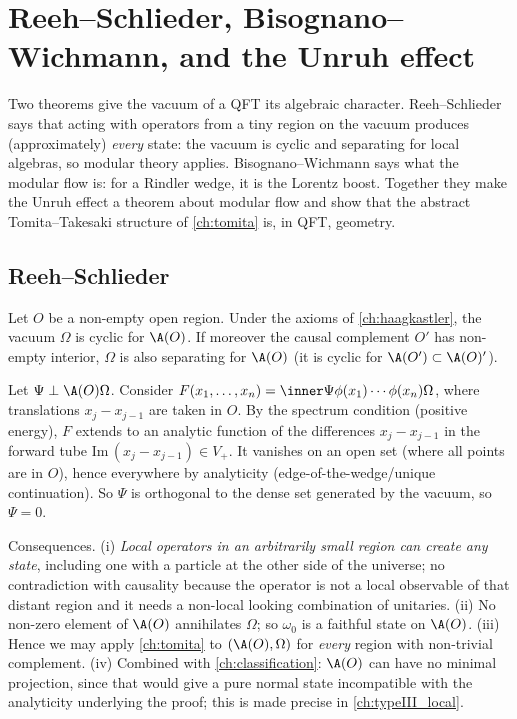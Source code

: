 \chapter{Reeh--Schlieder, Bisognano--Wichmann, and the Unruh effect}\label{ch:rs_bw}

\begin{physmotiv}
Two theorems give the vacuum of a QFT its algebraic character. Reeh--Schlieder says that acting with operators from a tiny region on the vacuum produces (approximately) \emph{every} state: the vacuum is cyclic and separating for local algebras, so modular theory applies. Bisognano--Wichmann says what the modular flow is: for a Rindler wedge, it is the Lorentz boost. Together they make the Unruh effect a theorem about modular flow and show that the abstract Tomita--Takesaki structure of \cref{ch:tomita} is, in QFT, geometry.
\end{physmotiv}

\section{Reeh--Schlieder}

\begin{theorem}
Let $O$ be a non-empty open region. Under the axioms of \cref{ch:haagkastler}, the vacuum $\Omega$ is cyclic for $\A(O)$. If moreover the causal complement $O'$ has non-empty interior, $\Omega$ is also separating for $\A(O)$ (it is cyclic for $\A(O')\subset\A(O)'$).
\end{theorem}

\begin{proofsketch}
Let $\Psi\perp\A(O)\Omega$. Consider $F(x_1,\dots,x_n)=\inner\Psi{\phi(x_1)\cdots\phi(x_n)\Omega}$, where translations $x_j-x_{j-1}$ are taken in $O$. By the spectrum condition (positive energy), $F$ extends to an analytic function of the differences $x_j-x_{j-1}$ in the forward tube $\mathrm{Im}\,(x_j-x_{j-1})\in V_+$. It vanishes on an open set (where all points are in $O$), hence everywhere by analyticity (edge-of-the-wedge/unique continuation). So $\Psi$ is orthogonal to the dense set generated by the vacuum, so $\Psi=0$.
\end{proofsketch}

Consequences. (i) \emph{Local operators in an arbitrarily small region can create any state}, including one with a particle at the other side of the universe; no contradiction with causality because the operator is not a local observable of that distant region and it needs a non-local looking combination of unitaries. (ii) No non-zero element of $\A(O)$ annihilates $\Omega$; so $\omega_0$ is a faithful state on $\A(O)$. (iii) Hence we may apply \cref{ch:tomita} to $(\A(O),\Omega)$ for \emph{every} region with non-trivial complement. (iv) Combined with \cref{ch:classification}: $\A(O)$ can have no minimal projection, since that would give a pure normal state incompatible with the analyticity underlying the proof; this is made precise in \cref{ch:typeIII_local}.

